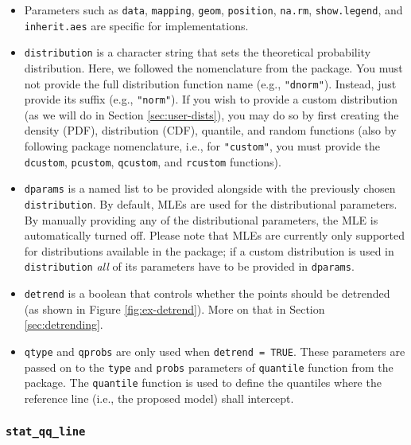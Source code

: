\begin{itemize}
\item
  Parameters such as \texttt{data}, \texttt{mapping}, \texttt{geom},
  \texttt{position}, \texttt{na.rm}, \texttt{show.legend}, and
  \texttt{inherit.aes} are specific for  implementations.
\item
  \texttt{distribution} is a character string that sets the theoretical
  probability distribution. Here, we followed the nomenclature from the
   package. You must not provide the full distribution
  function name (e.g., \texttt{"dnorm"}). Instead, just provide its
  suffix (e.g., \texttt{"norm"}). If you wish to provide a custom
  distribution (as we will do in Section \ref{sec:user-dists}), you may
  do so by first creating the density (PDF), distribution (CDF),
  quantile, and random functions (also by following  package
  nomenclature, i.e., for \texttt{"custom"}, you must provide the
  \texttt{dcustom}, \texttt{pcustom}, \texttt{qcustom}, and
  \texttt{rcustom} functions).
\item
  \texttt{dparams} is a named list to be provided alongside with the
  previously chosen \texttt{distribution}. By default, MLEs are used for
  the distributional parameters. By manually providing any of the
  distributional parameters, the MLE is automatically turned off. Please
  note that MLEs are currently only supported for distributions
  available in the  package; if a custom distribution is used
  in \texttt{distribution} \emph{all} of its parameters have to be
  provided in \texttt{dparams}.
\item
  \texttt{detrend} is a boolean that controls whether the points should
  be detrended (as shown in Figure \ref{fig:ex-detrend}). More on that
  in Section \ref{sec:detrending}.
\item
  \texttt{qtype} and \texttt{qprobs} are only used when
  \texttt{detrend\ =\ TRUE}. These parameters are passed on to the
  \texttt{type} and \texttt{probs} parameters of \texttt{quantile}
  function from the  package. The \texttt{quantile} function
  is used to define the quantiles where the reference line (i.e., the
  proposed model) shall intercept.
\end{itemize}

\subsubsection{\texorpdfstring{\texttt{stat\_qq\_line}}{stat\_qq\_line}}\label{stat_qq_line}

